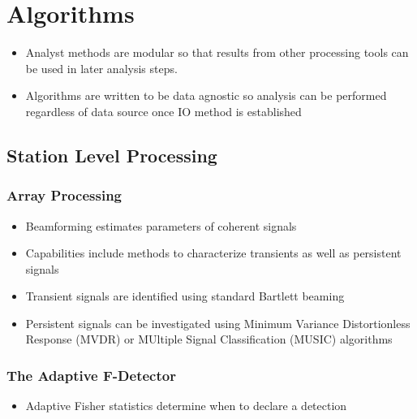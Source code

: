\documentclass[letterpaper,10pt,english]{sphinxmanual}
\begin{document}
\section{Algorithms}
\label{\detokenize{algorithms:algorithms}}\label{\detokenize{algorithms:id1}}\label{\detokenize{algorithms::doc}}\begin{itemize}
\item {} 
Analyst methods are modular so that results from other processing tools can be used in later analysis steps.

\item {} 
Algorithms are written to be data agnostic so analysis can be performed regardless of data source once IO method is established

\end{itemize}


\subsection{Station Level Processing}
\label{\detokenize{algorithms:station-level-processing}}

\subsubsection{Array Processing}
\label{\detokenize{algorithms:beamforming}}\begin{itemize}
\item {} 
Beamforming estimates parameters of coherent signals

\item {} 
Capabilities include methods to characterize transients as well as persistent signals

\item {} 
Transient signals are identified using standard Bartlett beaming

\item {} 
Persistent signals can be investigated using Minimum Variance Distortionless Response (MVDR) or MUltiple Signal Classification (MUSIC) algorithms

\end{itemize}


\subsubsection{The Adaptive F-Detector}
\label{\detokenize{algorithms:afd}}\begin{itemize}
\item {} 
Adaptive Fisher statistics determine when to declare a detection

\end{itemize}
\end{document}
